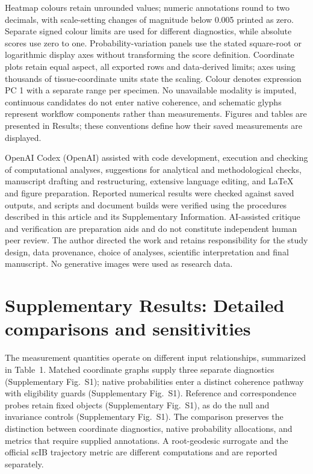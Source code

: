 \documentclass[11pt]{article}
\begin{document}
Heatmap colours retain unrounded values; numeric annotations round to two decimals, with scale-setting changes of magnitude below 0.005 printed as zero. Separate signed colour limits are used for different diagnostics, while absolute scores use zero to one. Probability-variation panels use the stated square-root or logarithmic display axes without transforming the score definition. Coordinate plots retain equal aspect, all exported rows and data-derived limits; axes using thousands of tissue-coordinate units state the scaling. Colour denotes expression PC 1 with a separate range per specimen. No unavailable modality is imputed, continuous candidates do not enter native coherence, and schematic glyphs represent workflow components rather than measurements. Figures and tables are presented in Results; these conventions define how their saved measurements are displayed.




OpenAI Codex (OpenAI) assisted with code development, execution and checking of computational analyses, suggestions for analytical and methodological checks, manuscript drafting and restructuring, extensive language editing, and LaTeX and figure preparation. Reported numerical results were checked against saved outputs, and scripts and document builds were verified using the procedures described in this article and its Supplementary Information. AI-assisted critique and verification are preparation aids and do not constitute independent human peer review. The author directed the work and retains responsibility for the study design, data provenance, choice of analyses, scientific interpretation and final manuscript. No generative images were used as research data.

\section*{Supplementary Results: Detailed comparisons and sensitivities}


The measurement quantities operate on different input relationships, summarized in Table~1. Matched coordinate graphs supply three separate diagnostics (Supplementary Fig.~S1); native probabilities enter a distinct coherence pathway with eligibility guards (Supplementary Fig.~S1). Reference and correspondence probes retain fixed objects (Supplementary Fig.~S1), as do the null and invariance controls (Supplementary Fig.~S1). The comparison preserves the distinction between coordinate diagnostics, native probability allocations, and metrics that require supplied annotations. A root-geodesic surrogate and the official scIB trajectory metric are different computations and are reported separately.
\end{document}
